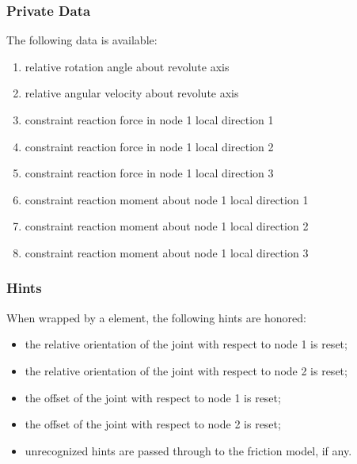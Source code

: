 \subsubsection{Private Data}
The following data is available:
\begin{enumerate}
\item {} relative rotation angle about revolute axis
\item {} relative angular velocity about revolute axis
\item {} constraint reaction force in node 1 local direction 1
\item {} constraint reaction force in node 1 local direction 2
\item {} constraint reaction force in node 1 local direction 3
\item {} constraint reaction moment about node 1 local direction 1
\item {} constraint reaction moment about node 1 local direction 2
\item {} constraint reaction moment about node 1 local direction 3
\end{enumerate}

\subsubsection{Hints}
When wrapped by a  element, the following hints are honored:
\begin{itemize}
\item {} the relative orientation of the joint
with respect to node 1 is reset;
\item {} the relative orientation of the joint
with respect to node 2 is reset;
\item {} the offset of the joint
with respect to node 1 is reset;
\item {} the offset of the joint
with respect to node 2 is reset;
\item unrecognized hints are passed through to the friction model,
if any.
\end{itemize}




